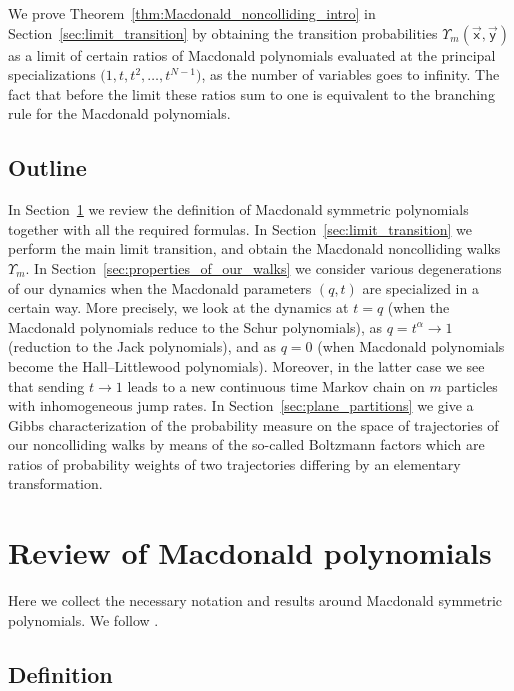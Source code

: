 \documentclass[pdftex]{sigma}
\numberwithin{equation}{section}
\begin{document}
We prove Theorem~\ref{thm:Macdonald_noncolliding_intro}
in Section~\ref{sec:limit_transition}
by obtaining the transition probabilities
$\Upsilon_m(\vec{\mathsf{x}},\vec{\mathsf{y}})$
as a limit of certain
ratios of Macdonald polynomials
evaluated at the principal specializations
$\big(1,t,t^2,\dots,t^{N-1} \big)$, as the number of variables
goes to infinity. The fact that before the limit
these ratios sum to one is equivalent to the branching
rule for the Macdonald polynomials.

\subsection{Outline}

In Section~\ref{sec:macdonald_polynomials} we review the definition
of Macdonald symmetric polynomials together
with all the required formulas.
In Section~\ref{sec:limit_transition} we perform the main limit
transition, and obtain the Macdonald noncolliding walks
$\Upsilon_m$.
In Section~\ref{sec:properties_of_our_walks}
we consider various degenerations of our dynamics
when the Macdonald parameters $(q,t)$ are specialized in a certain way.
More precisely, we look at the dynamics at $t=q$ (when the Macdonald polynomials
reduce to the Schur polynomials), as $q=t^\alpha\to1$
(reduction to the Jack polynomials),
and as $q=0$ (when Macdonald polynomials become the Hall--Littlewood polynomials).
Moreover, in the latter case we see that sending $t\to1$ leads
to a new continuous time Markov chain on $m$ particles with
inhomogeneous jump rates.
In Section~\ref{sec:plane_partitions} we
give a Gibbs characterization of the probability measure
on the space of trajectories of our noncolliding walks
by means of the so-called Boltzmann factors which are ratios of
probability weights of two trajectories differing by an elementary transformation.

\section{Review of Macdonald polynomials}\label{sec:macdonald_polynomials}

Here we collect the necessary notation and results
around Macdonald symmetric polynomials.
We follow \cite[Chapter VI]{Macdonald1995}.

\subsection{Definition}\label{sub:Macdonald_polynomials_definition}
\end{document}
